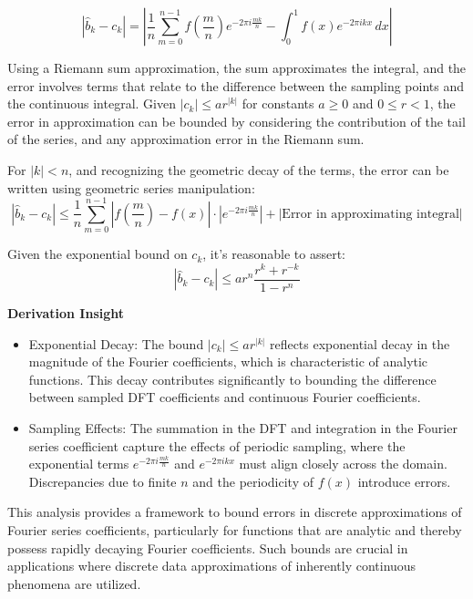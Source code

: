 \documentclass[8pt]{article}
\begin{document}
{\[
|\hat{b}_k - c_k| = \left| \frac{1}{n} \sum_{m=0}^{n-1} f\left(\frac{m}{n}\right) e^{-2\pi i \frac{mk}{n}} - \int_0^1 f(x) e^{-2\pi i k x} \, dx \right|
\]

Using a Riemann sum approximation, the sum approximates the integral, and the error involves terms that relate to the difference between the sampling points and the continuous integral. Given \(|c_k| \leq ar^{|k|}\) for constants \(a \geq 0\) and \(0 \leq r < 1\), the error in approximation can be bounded by considering the contribution of the tail of the series, and any approximation error in the Riemann sum.

For \(|k| < n\), and recognizing the geometric decay of the terms, the error can be written using geometric series manipulation:
\[
|\hat{b}_k - c_k| \leq \frac{1}{n} \sum_{m=0}^{n-1} |f\left(\frac{m}{n}\right) - f(x)| \cdot \left|e^{-2\pi i \frac{mk}{n}}\right| + \left| \text{Error in approximating integral} \right|
\]

Given the exponential bound on \(c_k\), it's reasonable to assert:
\[
|\hat{b}_k - c_k| \leq ar^n \frac{r^k + r^{-k}}{1 - r^n}
\]

\textbf{Derivation Insight}

\begin{itemize}
    \item Exponential Decay: The bound \(|c_k| \leq ar^{|k|}\) reflects exponential decay in the magnitude of the Fourier coefficients, which is characteristic of analytic functions. This decay contributes significantly to bounding the difference between sampled DFT coefficients and continuous Fourier coefficients.
    \item Sampling Effects: The summation in the DFT and integration in the Fourier series coefficient capture the effects of periodic sampling, where the exponential terms \(e^{-2\pi i \frac{mk}{n}}\) and \(e^{-2\pi i k x}\) must align closely across the domain. Discrepancies due to finite \(n\) and the periodicity of \(f(x)\) introduce errors.
\end{itemize}

This analysis provides a framework to bound errors in discrete approximations of Fourier series coefficients, particularly for functions that are analytic and thereby possess rapidly decaying Fourier coefficients. Such bounds are crucial in applications where discrete data approximations of inherently continuous phenomena are utilized.

}
\end{document}
